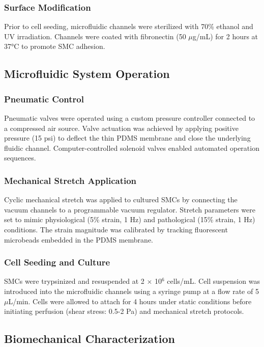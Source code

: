 \documentclass[materials,article,submit,moreauthors,pdftex]{Definitions/mdpi}
\begin{document}
\subsubsection{Surface Modification}

Prior to cell seeding, microfluidic channels were sterilized with 70\% ethanol and UV irradiation. Channels were coated with fibronectin (50 $\mu$g/mL) for 2 hours at 37°C to promote SMC adhesion.

\subsection{Microfluidic System Operation}

\subsubsection{Pneumatic Control}

Pneumatic valves were operated using a custom pressure controller connected to a compressed air source. Valve actuation was achieved by applying positive pressure (15 psi) to deflect the thin PDMS membrane and close the underlying fluidic channel. Computer-controlled solenoid valves enabled automated operation sequences.

\subsubsection{Mechanical Stretch Application}

Cyclic mechanical stretch was applied to cultured SMCs by connecting the vacuum channels to a programmable vacuum regulator. Stretch parameters were set to mimic physiological (5\% strain, 1 Hz) and pathological (15\% strain, 1 Hz) conditions. The strain magnitude was calibrated by tracking fluorescent microbeads embedded in the PDMS membrane.

\subsubsection{Cell Seeding and Culture}

SMCs were trypsinized and resuspended at 2 $\times$ 10$^6$ cells/mL. Cell suspension was introduced into the microfluidic channels using a syringe pump at a flow rate of 5 $\mu$L/min. Cells were allowed to attach for 4 hours under static conditions before initiating perfusion (shear stress: 0.5-2 Pa) and mechanical stretch protocols.

\subsection{Biomechanical Characterization}
\end{document}
